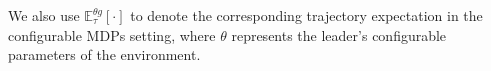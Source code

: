 \documentclass[letterpaper]{article} %
\providecommand{\E}{\mathbb{E}} %
\newtheorem{lemma}{Lemma}
\begin{document}
We also use $\mathbb{E}_\tau^{\theta g}[\cdot]$ to denote the corresponding trajectory expectation in the configurable MDPs setting, where $\theta$ represents the leader's configurable parameters of the environment.


\end{document}
